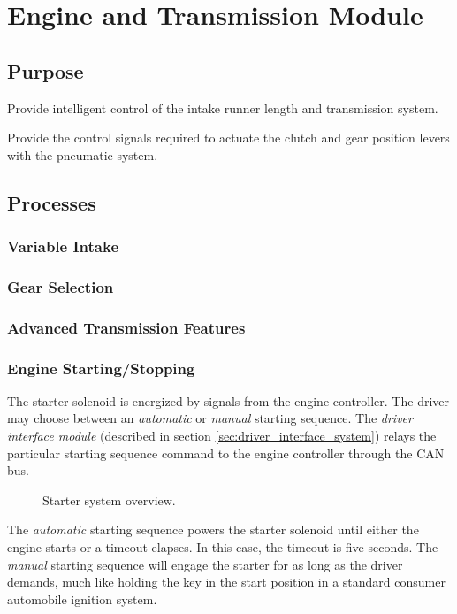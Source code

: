 \section{Engine and Transmission Module}


\subsection{Purpose}

Provide intelligent control of the intake runner length and transmission
system.

Provide the control signals required to actuate the clutch and gear
position levers with the pneumatic system.


\subsection{Processes}


\subsubsection{Variable Intake}


\subsubsection{Gear Selection}


\subsubsection{Advanced Transmission Features}


\subsubsection{Engine Starting/Stopping}

The starter solenoid is energized by signals from the engine controller. The driver may choose between an \emph{automatic} or \emph{manual} starting sequence. The \emph{driver interface module} (described in section \ref{sec:driver_interface_system}) relays the particular starting sequence command to the engine controller through the CAN bus.

\begin{figure}[H]
\centering
%
\caption{Starter system overview.}
\label{fig:starter_system_overview}
\end{figure}

The \emph{automatic} starting sequence powers the starter solenoid until either the engine starts or a timeout elapses. In this case, the timeout is five seconds. The \emph{manual} starting sequence will engage the starter for as long as the driver demands, much like holding the key in the start position in a standard consumer automobile ignition system. 

